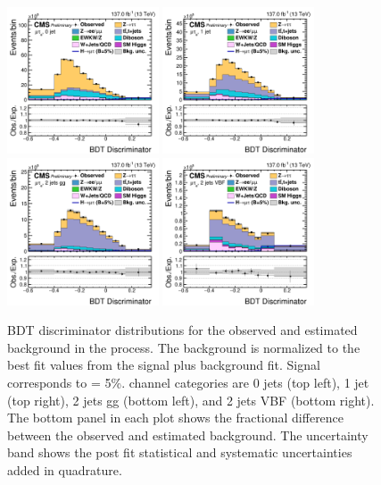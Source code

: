 \begin{figure}[htbp!]
  \centering
  \includegraphics[width=0.4\textwidth]{plots/chapter9/BDT/mue/0jet.png}
  \includegraphics[width=0.4\textwidth]{plots/chapter9/BDT/mue/1jet.png} \\
  \includegraphics[width=0.4\textwidth]{plots/chapter9/BDT/mue/2jet_gg.png}
  \includegraphics[width=0.4\textwidth]{plots/chapter9/BDT/mue/2jet_vbf.png} \\
  \caption{BDT discriminator distributions for the observed and estimated background in the \Hmue process. The background is normalized to the best fit values from the signal plus background fit. Signal corresponds to \BHmt = 5\%. \Hmue channel categories are 0 jets (top left), 1 jet (top right), 2 jets gg (bottom left), and 2 jets VBF (bottom right). The bottom panel in each plot shows the fractional difference between the observed and estimated background. The uncertainty band shows the post fit statistical and systematic uncertainties added in quadrature.}
  \label{fig:bdt_mue}
\end{figure}

